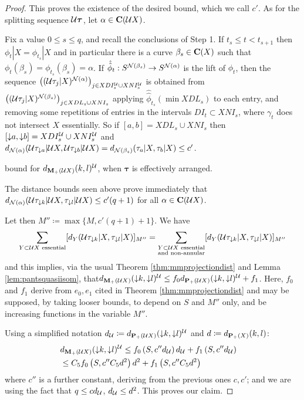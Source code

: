 \begin{proof}
This proves the existence of the desired bound, which we call $c'$. As for the splitting sequence ${\mathcal U}\bm\tau$, let $\alpha\in\mathbf C({\mathcal U} X)$.  

Fix a value $0\leq s \leq q$, and recall the conclusions of Step 1. If $t_s\leq t < t_{s+1}$ then $\phi_t|X=\phi_{t_s}|X$ and in particular there is a curve $\beta_s\in \mathbf C(X)$ such that $\phi_t(\beta_s)=\phi_{t_s}(\beta_s)=\alpha$. If $\hat{\hat\phi}_t: S^{{\mathcal N}(\beta_s)}\rightarrow S^{{\mathcal N}(\alpha)}$ is the lift of $\phi_t$, then the sequence $\left(({\mathcal U}\tau_j|X)^{{\mathcal N}(\alpha)}\right)_{j\in XDI_s^{\mathcal U} \cup XNI_s^{\mathcal U}}$ is obtained from $\left(({\mathcal U}\tau_j|X)^{{\mathcal N}(\beta_s)}\right)_{j\in XDL_s\cup XNI_s}$ applying $\hat{\hat\phi}_{t_s}(\min XDL_s)$ to each entry, and removing some repetitions of entries in the intervals $DI_t\subset XNI_s$, where $\gamma_t$ does not intersect $X$ essentially. So if $[a,b]=XDL_s\cup XNI_s$ then $[\mathord{\downarrow} a,\mathord{\downarrow} b]=XDI_s^{\mathcal U}\cup XNI_s^{\mathcal U}$ and  $d_{{\mathcal N}(\alpha)}({\mathcal U}\tau_{\mathord{\downarrow} a}|{\mathcal U} X,{\mathcal U}\tau_{\mathord{\downarrow} b}|{\mathcal U} X)=d_{{\mathcal N}(\beta_s)}(\tau_a|X,\tau_b|X)\leq c'$.

 bound for $d_{{\mathbf{M}_+}({\mathcal U} X)}(k,l)^{\mathcal U}$, when $\bm\tau$ is effectively arranged.

The distance bounds seen above prove immediately that\linebreak $d_{{\mathcal N}(\alpha)}({\mathcal U}\tau_{\mathord{\downarrow} k}|{\mathcal U} X,\tau_{\mathord{\downarrow} l}|{\mathcal U} X)\leq c'(q+1)$ for all $\alpha\in \mathbf C({\mathcal U} X)$.

Let then $M''\coloneqq \max \{M,c'(q+1)+1\}$. We have
$$
\sum_{Y\subset {\mathcal U} X\text{ essential}} [d_Y({\mathcal U}\tau_{\mathord{\downarrow} k}|X,\tau_{\mathord{\downarrow} l}|X)]_{M''} =
\sum_{\substack{Y\subset {\mathcal U} X\text{ essential} \\ \text{and non-annular}}} [d_Y({\mathcal U}\tau_{\mathord{\downarrow} k}|X,\tau_{\mathord{\downarrow} l}|X)]_{M''}
$$
and this implies, via the usual Theorem \ref{thm:mmprojectiondist} and Lemma \ref{lem:pantsquasiisom}, that\linebreak $d_{{\mathbf{M}_+}({\mathcal U} X)}(\mathord{\downarrow} k,\mathord{\downarrow} l)^{\mathcal U}\leq f_0 d_{{\mathbf{P}_+}({\mathcal U} X)}(\mathord{\downarrow} k,\mathord{\downarrow} l)^{\mathcal U} + f_1$. Here, $f_0$ and $f_1$ derive from $e_0,e_1$ cited in Theorem \ref{thm:mmprojectiondist} and may be supposed, by taking looser bounds, to depend on $S$ and $M''$ only, and be increasing functions in the variable $M''$.

Using a simplified notation $d_{\mathcal U}\coloneqq d_{{\mathbf{P}_+}({\mathcal U} X)}(\mathord{\downarrow} k,\mathord{\downarrow} l)^{\mathcal U}$ and $d\coloneqq d_{{\mathbf{P}_+}(X)}(k,l)$:
\begin{eqnarray*}
 & d_{{\mathbf{M}_+}({\mathcal U} X)}(\mathord{\downarrow} k,\mathord{\downarrow} l)^{\mathcal U}\leq f_0\left(S,c'' d_{\mathcal U}\right) d_{\mathcal U} + f_1\left(S,c'' d_{\mathcal U}\right) & \\
 &\leq C_5 f_0\left(S,c'' C_5 d^2\right) d^2 + f_1\left(S, c'' C_5 d^2\right) & 
\end{eqnarray*}
where $c''$ is a further constant, deriving from the previous ones $c,c'$; and we are using the fact that $q\leq c d_{\mathcal U}$, $d_{\mathcal U}\leq d^2$. This proves our claim.
\end{proof}

